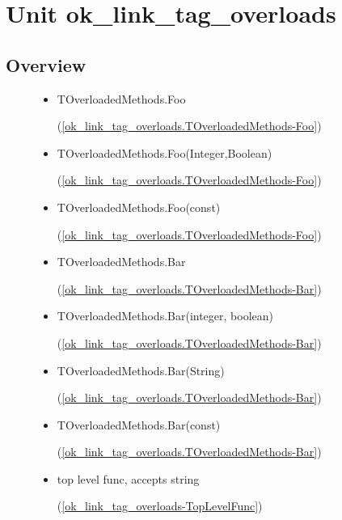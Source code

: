 \documentclass{report}
\begin{document}
\newlength{\tmplength}
\chapter{Unit ok{\_}link{\_}tag{\_}overloads}
\section{Overview}
\begin{description}
\item[\texttt{\begin{ttfamily}TLinkHolder\end{ttfamily} Class}]\begin{itemize}
\item \begin{ttfamily}TOverloadedMethods.Foo\end{ttfamily}(\ref{ok_link_tag_overloads.TOverloadedMethods-Foo})
\item \begin{ttfamily}TOverloadedMethods.Foo(Integer,Boolean)\end{ttfamily}(\ref{ok_link_tag_overloads.TOverloadedMethods-Foo})
\item \begin{ttfamily}TOverloadedMethods.Foo(const)\end{ttfamily}(\ref{ok_link_tag_overloads.TOverloadedMethods-Foo})
\item \begin{ttfamily}TOverloadedMethods.Bar\end{ttfamily}(\ref{ok_link_tag_overloads.TOverloadedMethods-Bar})
\item \begin{ttfamily}TOverloadedMethods.Bar(integer, boolean)\end{ttfamily}(\ref{ok_link_tag_overloads.TOverloadedMethods-Bar})
\item \begin{ttfamily}TOverloadedMethods.Bar(String)\end{ttfamily}(\ref{ok_link_tag_overloads.TOverloadedMethods-Bar})
\item \begin{ttfamily}TOverloadedMethods.Bar(const)\end{ttfamily}(\ref{ok_link_tag_overloads.TOverloadedMethods-Bar})
\item \begin{ttfamily}top level func, accepts string\end{ttfamily}(\ref{ok_link_tag_overloads-TopLevelFunc})

\end{itemize}
\end{description}
\end{document}
